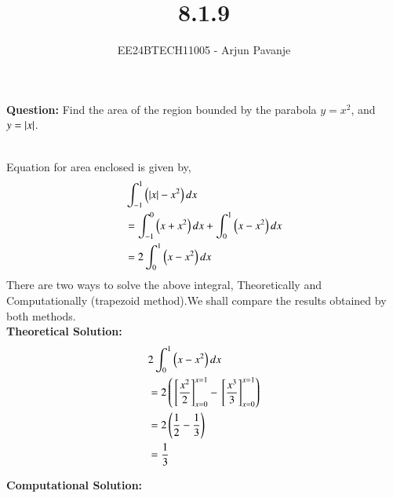 \documentclass[journal]{IEEEtran}
\begin{document}

\vspace{3cm}

\title{8.1.9}
\author{EE24BTECH11005 - Arjun Pavanje}
{\let\newpage\relax\maketitle}
\textbf{Question:}
Find the area of the region bounded by the parabola $y=x^2$,  and $y=\left\vert x\right\vert$.

\solution\\

Equation for area enclosed is given by,
\begin{align}
  &\int_{-1}^1\left(\left\vert x\right\vert-x^2\right)dx\\
  &=\int_{-1}^{0}\left(x+x^2\right)dx + \int_0^1\left(x-x^2\right)dx\\
  &=2\int_0^1\left(x-x^2\right)dx
\end{align}
There are two ways to solve the above integral, Theoretically and Computationally (trapezoid method).We shall compare the results obtained by both methods.\\
\textbf{Theoretical Solution:}\\
\begin{align}
  &2\int_0^1 \left(x-x^2\right)dx\\
  &=2\left({}\left[\frac{x^2}{2}\right]_{x=0}^{x=1} -{}\left[\frac{x^3}{3}\right]_{x=0}^{x=1}\right)\\
  &=2\left(\frac{1}{2}-\frac{1}{3}\right)\\
  &=\frac{1}{3}
\end{align}

\textbf{Computational Solution:}\\
\end{document}

